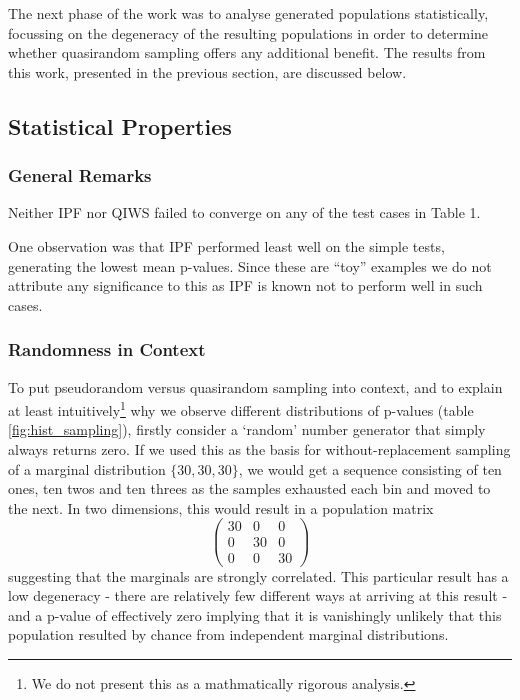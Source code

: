 \documentclass{JASSS}
\begin{document}
The next phase of the work was to analyse generated populations
statistically, focussing on the degeneracy of the resulting populations in order to determine whether quasirandom sampling offers any additional benefit.
The results from this work, presented in the previous section, are
discussed below.

\subsection{Statistical Properties}\label{statistical-properties-1}

\subsubsection{General Remarks}\label{general-remarks}

Neither IPF nor QIWS failed to converge on any of the test cases in
Table 1.

One observation was that IPF performed least well on the
simple tests, generating the lowest mean p-values. Since these are
``toy'' examples we do not attribute any significance to this as IPF is known not to perform well in such cases.

\subsubsection{Randomness in Context}\label{randomness-in-context}

To put pseudorandom versus quasirandom sampling into context, and to explain at least intuitively\footnote{We do not present this as a mathmatically rigorous analysis.} 
why we observe different distributions of p-values (table \ref{fig:hist_sampling}), firstly consider a
`random' number generator that simply always returns zero. If we used
this as the basis for without-replacement sampling of a marginal
distribution \(\lbrace30,30,30\rbrace\), we would get a sequence
consisting of ten ones, ten twos and ten threes as the samples exhausted
each bin and moved to the next. In two dimensions, this would result in
a population matrix
\[\left( \begin{array}{ccc}
30 & 0 & 0 \\
0 & 30 & 0 \\
0 & 0 & 30 \end{array} \right)\]
suggesting that the marginals are strongly correlated. This particular
result has a low degeneracy - there are relatively few different ways at
arriving at this result - and a p-value of effectively zero implying
that it is vanishingly unlikely that this population resulted by chance from independent marginal distributions.
\end{document}
